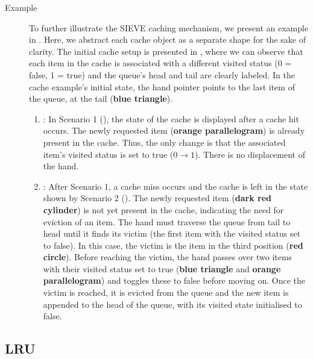 \begin{description}
    \item[Example] To further illustrate the SIEVE caching mechanism, we present an example in . Here, we abstract each cache object as a separate shape for the sake of clarity. The initial cache setup is presented in , where we can observe that each item in the cache is associated with a different visited status (0 = false, 1 = true) and the queue's head and tail are clearly labeled. In the cache example's initial state, the hand pointer points to the last item of the queue, at the tail ({\color{blue}\textbf{blue triangle}}).

\begin{enumerate}[label=(\arabic*)]
        \item {}:
        In Scenario 1 (), the state of the cache is displayed after a cache hit occurs. The newly requested item ({\color{orange}\textbf{orange parallelogram}}) is already present in the cache. Thus, the only change is that the associated item's visited status is set to true ($0\rightarrow1$). There is no displacement of the hand.

        \item {}: 
        After Scenario 1, a cache miss occurs and the cache is left in the state shown by Scenario 2 (). The newly requested item ({\color{darkred}\textbf{dark red cylinder}}) is not yet present in the cache, indicating the need for eviction of an item. The hand must traverse the queue from tail to head until it finds its victim (the first item with the visited status set to false). In this case, the victim is the item in the third position ({\color{red}\textbf{red circle}}). Before reaching the victim, the hand passes over two items with their visited status set to true ({\color{blue}\textbf{blue triangle}} and {\color{orange}\textbf{orange parallelogram}}) and toggles these to false before moving on. Once the victim is reached, it is evicted from the queue and the new item is appended to the head of the queue, with its visited state initialised to false.

    \end{enumerate}
\end{description}






\subsection{LRU}

